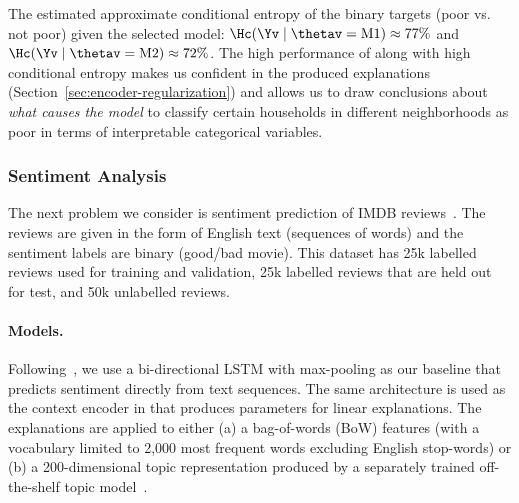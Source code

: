 \documentclass[twoside,11pt]{article}
\begin{document}
The estimated approximate conditional entropy of the binary targets (poor vs. not poor) given the selected model: $\Hc(\Yv \mid \thetav = \mathrm{M1}) \approx 77\%$ and $\Hc(\Yv \mid \thetav = \mathrm{M2}) \approx 72\%$.
The high performance of {\CEN} along with high conditional entropy makes us confident in the produced explanations (Section~\ref{sec:encoder-regularization}) and allows us to draw conclusions about \emph{what causes the model} to classify certain households in different neighborhoods as poor in terms of interpretable categorical variables.


\subsubsection{Sentiment Analysis}
\label{sec:applications-classification-sentiment-analysis}

The next problem we consider is sentiment prediction of IMDB reviews~\citep{maas2011learning}.
The reviews are given in the form of English text (sequences of words) and the sentiment labels are binary (good/bad movie).
This dataset has 25k labelled reviews used for training and validation, 25k labelled reviews that are held out for test, and 50k unlabelled reviews.

\paragraph{Models.}
Following~\citet{johnson2016supervised}, we use a bi-directional LSTM with max-pooling as our baseline that predicts sentiment directly from text sequences.
The same architecture is used as the context encoder in {\CEN} that produces parameters for linear explanations.
The explanations are applied to either (a) a bag-of-words (BoW) features (with a vocabulary limited to 2,000 most frequent words excluding English stop-words) or (b) a 200-dimensional topic representation produced by a separately trained off-the-shelf topic model~\citep{blei2003latent}.
\end{document}
